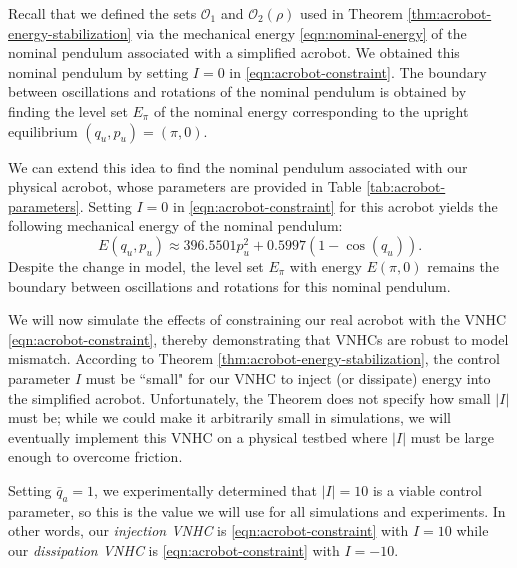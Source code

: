 \documentclass[journal,twoside,web, twocolumn,draftcls]{ieeecolor}
\begin{document}
Recall that we defined the sets \(\mathcal{O}_1\) and
\(\mathcal{O}_2(\rho)\) used in Theorem \ref{thm:acrobot-energy-stabilization}
via the mechanical energy \eqref{eqn:nominal-energy} of the nominal
pendulum associated with a simplified acrobot.
We obtained this nominal pendulum by setting \(I = 0\) in
\eqref{eqn:acrobot-constraint}.
The boundary between oscillations and rotations of the nominal
pendulum is obtained by finding the level set \(E_\pi\) of the nominal energy
corresponding to the upright equilibrium \((q_u,p_u) = (\pi,0)\).

We can extend this idea to find the nominal pendulum associated with our
physical acrobot, whose parameters are provided in Table
\ref{tab:acrobot-parameters}.
Setting \(I = 0\) in \eqref{eqn:acrobot-constraint} for this acrobot
yields the following mechanical energy of the nominal pendulum:
\[
    E(q_u,p_u) \approx 396.5501 p_u^2 + 0.5997(1 - \cos(q_u))
    .
\]
Despite the change in model, the level set \(E_\pi\) with energy 
\(E(\pi,0)\) remains the boundary between oscillations and rotations
for this nominal pendulum.

We will now simulate the effects of constraining our real acrobot with the VNHC
\eqref{eqn:acrobot-constraint}, thereby demonstrating that VNHCs are robust to
model mismatch.
According to Theorem \ref{thm:acrobot-energy-stabilization}, the control
parameter \(I\) must be ``small" for our VNHC to inject (or dissipate) energy
into the simplified acrobot. 
Unfortunately, the Theorem does not specify how small \(|I|\) must be;
while we could make it arbitrarily small in simulations, we will eventually
implement this VNHC on a physical testbed where \(|I|\) must be large enough to
overcome friction.

Setting \(\bar{q}_a = 1\), we experimentally determined that \(|I| = 10\) is a
viable control parameter, so this is the value we will use for all simulations
and experiments.
In other words, our \textit{injection VNHC} is \eqref{eqn:acrobot-constraint} with 
\(I = 10\) while our \textit{dissipation VNHC} is \eqref{eqn:acrobot-constraint} with 
\(I = -10\).

\begin{table}
    \centering
    \caption{Physical parameters for the real acrobot.}
    \label{tab:acrobot-parameters}
\end{table}
\end{document}
